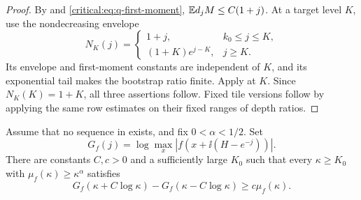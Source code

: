 \begin{proof}
By  and
\eqref{critical:eq:q-first-moment},
\(\mathbb E d_jM\le C(1+j)\). At a target level \(K\), use the
nondecreasing envelope
\[
 N_K(j)=
 \begin{cases}
  1+j,&k_0\le j\le K,\\
  (1+K)e^{j-K},&j\ge K.
 \end{cases}
\]
Its envelope and first-moment constants are independent of \(K\),
and its exponential tail makes the bootstrap ratio finite. Apply
 at \(K\). Since \(N_K(K)=1+K\),
all three assertions follow. Fixed tile versions follow by applying
the same row estimates on their fixed ranges of depth ratios.
\end{proof}

\begin{lemma}\label{critical:lem:growth-charge}
Assume that no sequence in  exists,
and fix \(0<\alpha<1/2\). Set
\[
 G_f(j)=\log\max_x|f(x+\ii(H-e^{-j}))|.
\]
There are constants \(C,c>0\) and a sufficiently large \(K_0\)
such that every \(\kappa\ge K_0\) with
\(\mu_f(\kappa)\ge\kappa^\alpha\) satisfies
\begin{equation}\label{critical:eq:growth-charge}
 G_f(\kappa+C\log\kappa)-G_f(\kappa-C\log\kappa)
 \ge c\mu_f(\kappa).
\end{equation}
\end{lemma}

